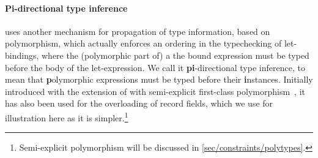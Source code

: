 \documentclass[acmsmall,screen,nonacm]{acmart}
\begin{document}
\paragraph{Pi-directional type inference}


\OCaml uses another mechanism for propagation of type
information, based on polymorphism, which actually enforces an ordering in
the typechecking of let-bindings, where the (polymorphic part of) a the
bound expression must be typed before the body of the let-expression.  We
call it \textbf{pi}-directional type inference, to mean that \textbf
polymorphic expressions must be typed before their \textbf instances.
Initially introduced with the extension of \ML with semi-explicit
first-class polymorphism~\cite {Garrigue-Remy/poly-ml}, it has also been
used for the overloading of record fields, which we use for illustration
here as it is simpler.\footnote {Semi-explicit polymorphism will be
discussed in \cref{sec/constraints/polytypes}.}
\end{document}
